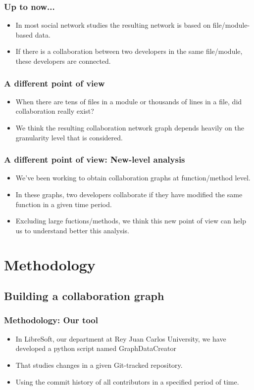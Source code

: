 \documentclass{beamer}
\begin{document}
\begin{frame}
\frametitle{Up to now...}
\begin{itemize}
\item In most social network studies the resulting network is based on file/module-based data.
\item If there is a collaboration between two developers in the same file/module, these developers are connected.
\end{itemize}
\end{frame}


\begin{frame}
\frametitle{A different point of view}
\begin{itemize}
\item When there are tens of files in a module or thousands of lines in a file, did collaboration really exist?
\item We think the resulting collaboration network graph depends heavily on the granularity level that is considered.
\end{itemize}
\end{frame}


\begin{frame}
\frametitle{A different point of view: New-level analysis}
\begin{itemize}
\item We've been working to obtain collaboration graphs at function/method level.
\item In these graphs, two developers collaborate if they have modified the same function in a given time period.
\item Excluding large fuctions/methods, we think this new point of view can help us to understand better this analysis.
\end{itemize}
\end{frame}

\section{Methodology}
\subsection{Building a collaboration graph}
\begin{frame}
\frametitle{Methodology: Our tool}
\begin{itemize}
\item In LibreSoft, our department at Rey Juan Carlos University,
we have developed a python script named GraphDataCreator 
\item That studies changes in a given 
Git-tracked repository.
\item Using the commit history of all contributors in a specified period of time.
\end{itemize}
\end{frame}
\end{document}
